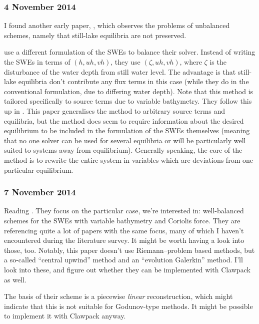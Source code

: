 \documentclass[a4paper,onecolumn,11pt]{report}
\begin{document}
\subsubsection*{4 November 2014}

I found another early paper, \citet{ambrosi1995approximation}, which observes the problems of unbalanced schemes, namely that still-lake equilibria are not preserved.

\citet{rogers2001adaptive} use a different formulation of the SWEs to balance their solver. Instead of writing the SWEs in terms of $(h, uh, vh)$, they use $(\zeta, uh, vh)$, where $\zeta$ is the disturbance of the water depth from still water level. The advantage is that still-lake equilibria don't contribute any flux terms in this case (while they do in the conventional formulation, due to differing water depth). Note that this method is tailored specifically to source terms due to variable bathymetry. They follow this up in \citet{rogers2003mathematical}. This paper generalises the method to arbitrary source terms and equilibria, but the method does seem to require information about the desired equilibrium to be included in the formulation of the SWEs themselves (meaning that no one solver can be used for several equilibria or will be particularly well suited to systems away from equilibrium). Generally speaking, the core of the method is to rewrite the entire system in variables which are deviations from one particular equilibrium.

\subsubsection*{7 November 2014}

Reading \citet{chertockwell}. They focus on the particular case, we're interested in: well-balanced schemes for the SWEs with variable bathymetry and Coriolis force. They are referencing quite a lot of papers with the same focus, many of which I haven't encountered during the literature survey. It might be worth having a look into those, too. Notably, this paper doesn't use Riemann--problem based methods, but a so-called ``central upwind'' method and an ``evolution Galerkin'' method. I'll look into these, and figure out whether they can be implemented with Clawpack as well.

The basis of their scheme is a piecewise \emph{linear} reconstruction, which might indicate that this is not suitable for Godunov-type methods. It might be possible to implement it with Clawpack anyway.
\end{document}
